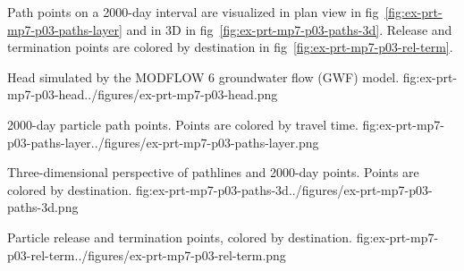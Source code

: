 Path points on a 2000-day interval are visualized in plan view in fig~\ref{fig:ex-prt-mp7-p03-paths-layer} and in 3D in fig~\ref{fig:ex-prt-mp7-p03-paths-3d}. Release and termination points are colored by destination in fig~\ref{fig:ex-prt-mp7-p03-rel-term}.

\begin{StandardFigure}{
    Head simulated by the MODFLOW 6 groundwater flow (GWF) model.
    }{fig:ex-prt-mp7-p03-head}{../figures/ex-prt-mp7-p03-head.png}
\end{StandardFigure}

\begin{StandardFigure}{
    2000-day particle path points. Points are colored by travel time.
    }{fig:ex-prt-mp7-p03-paths-layer}{../figures/ex-prt-mp7-p03-paths-layer.png}
\end{StandardFigure}

\begin{StandardFigure}{
    Three-dimensional perspective of pathlines and 2000-day points. Points are colored by destination.
    }{fig:ex-prt-mp7-p03-paths-3d}{../figures/ex-prt-mp7-p03-paths-3d.png}
\end{StandardFigure}

\begin{StandardFigure}{
    Particle release and termination points, colored by destination.
    }{fig:ex-prt-mp7-p03-rel-term}{../figures/ex-prt-mp7-p03-rel-term.png}
\end{StandardFigure}